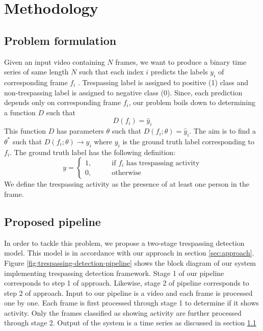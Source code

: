 \section{Methodology}
\subsection{Problem formulation}
\label{sec:prob-formulation}
Given an input video containing $N$ frames, we want to produce a binary time series of same length $N$ such that each index $i$ predicts the labels $y_i$ of corresponding frame $f_i$ . Trespassing label is assigned to positive (1) class and non-trespassing label is assigned to negative class (0). Since, each prediction depends only on corresponding frame $f_i$, our problem boils down to determining a function $D$ such that 
$$ D(f_i) = \hat{y}_i $$
This function $D$ has parameters $\theta$ such that $D(f_i;\theta) = \hat{y}_i$. The aim is to find a $\theta^*$ such that $D(f_i;\theta) \rightarrow y_i$ where $y_i$ is the ground truth label corresponding to $f_i$. The ground truth label has the following definition: 
$$y=
\begin{cases}
1,  &\qquad \textrm{if } f_i \textrm{ has trespassing activity} \\ 
0, 	&\qquad \textrm{otherwise}
\end{cases}
$$
We define the trespassing activity as the presence of at  least one person in the frame. 




\subsection{Proposed pipeline} 
In order to tackle this problem, we propose a two-stage trespassing detection model. This model is in accordance with our approach in section \ref{sec:approach}. Figure \ref{fig:trespassing-detection-pipeline} shows the block diagram of our system implementing trespassing detection framework. Stage 1 of our pipeline corresponds to step 1 of approach. Likewise, stage 2 of pipeline corresponds to step 2 of approach. Input to our pipeline is a video and each frame is processed one by one. Each frame is first processed through stage 1 to determine if it shows activity. Only the frames classified as showing activity are further processed through stage 2. Output of the system is a time series as discussed in section \ref{sec:prob-formulation}  




